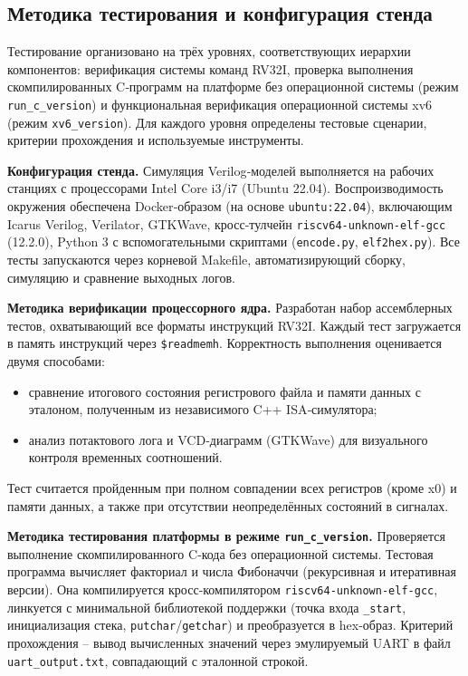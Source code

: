 \subsection{Методика тестирования и конфигурация стенда}

Тестирование организовано на трёх уровнях, соответствующих иерархии компонентов: верификация системы команд RV32I, проверка выполнения скомпилированных C‑программ на платформе без операционной системы (режим \texttt{run\_c\_version}) и функциональная верификация операционной системы xv6 (режим \texttt{xv6\_version}). Для каждого уровня определены тестовые сценарии, критерии прохождения и используемые инструменты.

\textbf{Конфигурация стенда.} Симуляция Verilog‑моделей выполняется на рабочих станциях с процессорами Intel Core i3/i7 (Ubuntu 22.04). Воспроизводимость окружения обеспечена Docker‑образом (на основе \texttt{ubuntu:22.04}), включающим Icarus Verilog, Verilator, GTKWave, кросс‑тулчейн \texttt{riscv64-unknown-elf-gcc} (12.2.0), Python 3 с вспомогательными скриптами (\texttt{encode.py}, \texttt{elf2hex.py}). Все тесты запускаются через корневой Makefile, автоматизирующий сборку, симуляцию и сравнение выходных логов.

\textbf{Методика верификации процессорного ядра.} Разработан набор ассемблерных тестов, охватывающий все форматы инструкций RV32I. Каждый тест загружается в память инструкций через \texttt{\$readmemh}. Корректность выполнения оценивается двумя способами:
\begin{itemize}
\item сравнение итогового состояния регистрового файла и памяти данных с эталоном, полученным из независимого C++ ISA‑симулятора;
\item анализ потактового лога и VCD‑диаграмм (GTKWave) для визуального контроля временных соотношений.
\end{itemize}
Тест считается пройденным при полном совпадении всех регистров (кроме x0) и памяти данных, а также при отсутствии неопределённых состояний в сигналах.

\textbf{Методика тестирования платформы в режиме \texttt{run\_c\_version}.} Проверяется выполнение скомпилированного C‑кода без операционной системы. Тестовая программа вычисляет факториал и числа Фибоначчи (рекурсивная и итеративная версии). Она компилируется кросс‑компилятором \texttt{riscv64-unknown-elf-gcc}, линкуется с минимальной библиотекой поддержки (точка входа \texttt{\_start}, инициализация стека, \texttt{putchar}/\texttt{getchar}) и преобразуется в hex‑образ. Критерий прохождения – вывод вычисленных значений через эмулируемый UART в файл \texttt{uart\_output.txt}, совпадающий с эталонной строкой.

